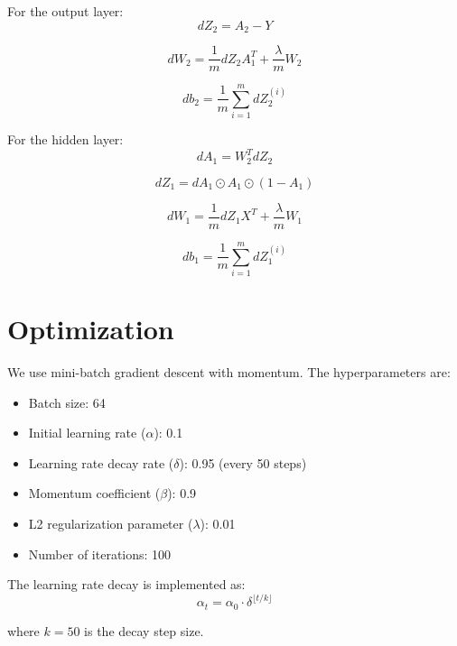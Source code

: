 \documentclass[times,final,english]{revdetua}
\begin{document}
For the output layer:
\begin{equation}
dZ_2 = A_2 - Y
\end{equation}

\begin{equation}
dW_2 = \frac{1}{m}dZ_2A_1^T + \frac{\lambda}{m}W_2
\end{equation}

\begin{equation}
db_2 = \frac{1}{m}\sum_{i=1}^m dZ_2^{(i)}
\end{equation}

For the hidden layer:
\begin{equation}
dA_1 = W_2^T dZ_2
\end{equation}

\begin{equation}
dZ_1 = dA_1 \odot A_1 \odot (1-A_1)
\end{equation}

\begin{equation}
dW_1 = \frac{1}{m}dZ_1X^T + \frac{\lambda}{m}W_1
\end{equation}

\begin{equation}
db_1 = \frac{1}{m}\sum_{i=1}^m dZ_1^{(i)}
\end{equation}

\section{Optimization}

We use mini-batch gradient descent with momentum. The hyperparameters are:
\begin{itemize}
    \item Batch size: 64
    \item Initial learning rate ($\alpha$): 0.1
    \item Learning rate decay rate ($\delta$): 0.95 (every 50 steps)
    \item Momentum coefficient ($\beta$): 0.9
    \item L2 regularization parameter ($\lambda$): 0.01
    \item Number of iterations: 100
\end{itemize}

The learning rate decay is implemented as:
\begin{equation}
\alpha_t = \alpha_0 \cdot \delta^{\lfloor t/k \rfloor}
\end{equation}

where $k = 50$ is the decay step size.
\end{document}
